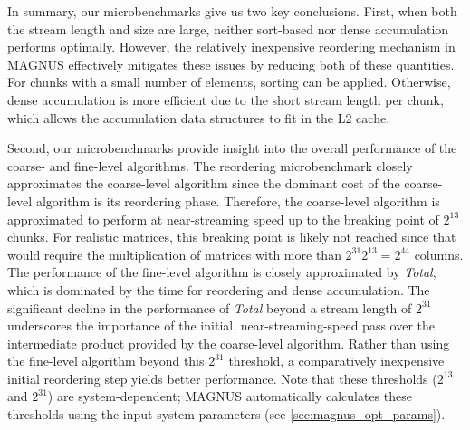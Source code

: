 In summary, our microbenchmarks give us two key conclusions.
First, when both the stream length and size are large, neither sort-based nor dense accumulation performs optimally. However, the relatively inexpensive reordering mechanism in MAGNUS effectively mitigates these issues by reducing both of these quantities. For chunks with a small number of elements, sorting can be applied. Otherwise, dense accumulation is more efficient due to the short stream length per chunk, which allows the accumulation data structures to fit in the L2 cache.

Second, our microbenchmarks provide insight into the overall performance of the coarse- and fine-level algorithms.
The reordering microbenchmark closely approximates the coarse-level algorithm since the dominant cost of the coarse-level algorithm is its reordering phase.
Therefore, the coarse-level algorithm is approximated to perform at near-streaming speed up to the breaking point of $2^{13}$ chunks.
For realistic matrices, this breaking point is likely not reached since that would require the multiplication of matrices with more than $2^{31}2^{13} = 2^{44}$ columns.
The performance of the fine-level algorithm is closely approximated by \textit{Total}, which is dominated by the time for reordering and dense accumulation.
The significant decline in the performance of \textit{Total} beyond a stream length of $2^{31}$ underscores the importance of the initial, near-streaming-speed pass over the intermediate product provided by the coarse-level algorithm.
Rather than using the fine-level algorithm beyond this $2^{31}$ threshold, a comparatively inexpensive initial reordering step yields better performance.
Note that these thresholds ($2^{13}$ and $2^{31}$) are system-dependent; MAGNUS automatically calculates these thresholds using the input system parameters (see \autoref{sec:magnus_opt_params}).


